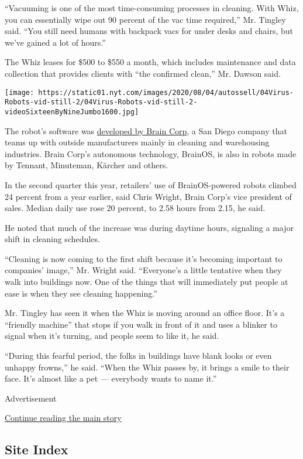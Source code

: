 ``Vacuuming is one of the most time-consuming processes in cleaning.
With Whiz, you can essentially wipe out 90 percent of the vac time
required,'' Mr. Tingley said. ``You still need humans with backpack vacs
for under desks and chairs, but we've gained a lot of hours.''

The Whiz leases for \$500 to \$550 a month, which includes maintenance
and data collection that provides clients with ``the confirmed clean,''
Mr. Dawson said.

\texttt{[image: https://static01.nyt.com/images/2020/08/04/autossell/04Virus-Robots-vid-still-2/04Virus-Robots-vid-still-2-videoSixteenByNineJumbo1600.jpg]}

The robot's software was
\href{https://www.nytimes.com/2020/04/10/business/coronavirus-workplace-automation.html}{developed
by Brain Corp}, a San Diego company that teams up with outside
manufacturers mainly in cleaning and warehousing industries. Brain
Corp's autonomous technology, BrainOS, is also in robots made by
Tennant, Minuteman, Kärcher and others.

In the second quarter this year, retailers' use of BrainOS-powered
robots climbed 24 percent from a year earlier, said Chris Wright, Brain
Corp's vice president of sales. Median daily use rose 20 percent, to
2.58 hours from 2.15, he said.

He noted that much of the increase was during daytime hours, signaling a
major shift in cleaning schedules.

``Cleaning is now coming to the first shift because it's becoming
important to companies' image,'' Mr. Wright said. ``Everyone's a little
tentative when they walk into buildings now. One of the things that will
immediately put people at ease is when they see cleaning happening.''

Mr. Tingley has seen it when the Whiz is moving around an office floor.
It's a ``friendly machine'' that stops if you walk in front of it and
uses a blinker to signal when it's turning, and people seem to like it,
he said.

``During this fearful period, the folks in buildings have blank looks or
even unhappy frowns,'' he said. ``When the Whiz passes by, it brings a
smile to their face. It's almost like a pet --- everybody wants to name
it.''

Advertisement

\protect\hyperlink{after-bottom}{Continue reading the main story}

\hypertarget{site-index}{%
\subsection{Site Index}\label{site-index}}

